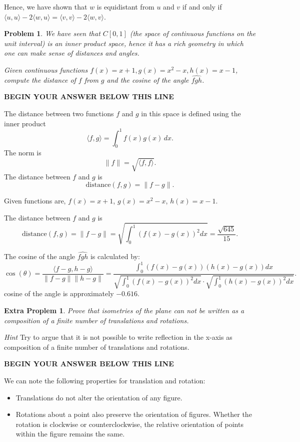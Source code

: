 \documentclass[letter,12pt]{article}
\newtheorem{problem}[main_theorem]{Problem}
\newtheorem{extraproblem}[main_theorem]{Extra Proplem}
\newcommand{\answerspacetop}{
	\begin{center}
		\textbf{BEGIN YOUR ANSWER BELOW THIS LINE} \\ \hrulefill
	\end{center}
}
\begin{document}
Hence, we have shown that $w$ is equidistant from $u$ and $v$ if and only if $\langle u,u \rangle - 2\langle w,u \rangle = \langle v,v \rangle - 2\langle w,v \rangle$.
\pagebreak

\begin{problem} We have seen that $C[0,1]$ (the space of continuous functions on the unit interval)  is an inner product space, hence it has a rich geometry in which one can make sense of distances and angles.

Given continuous functions $f(x)=x+1,g(x)=x^2-x,h(x)=x-1$, compute the distance of $f$ from $g$ and the cosine of the angle $\widehat{fgh}$.
\end{problem}

\answerspacetop
The distance between two functions $f$ and $g$ in this space is defined using the inner product
$$
\langle f, g \rangle = \int_0^1 f(x)g(x) \, dx.
$$
The norm is
$$
\|f\| = \sqrt{\langle f, f \rangle}.
$$
The distance between $f$ and $g$ is
$$
\text{distance}(f, g) = \|f - g\|.
$$

Given functions are, $f(x) = x + 1$, $g(x) = x^2 - x$, $h(x) = x - 1$.

The distance between $f$ and $g$ is 
$$
\text{distance}(f, g) = \|f - g\| = \sqrt{\int_0^1 (f(x) - g(x))^2 dx} = \frac{\sqrt{645}}{15}.
$$

The cosine of the angle $\widehat{fgh}$ is calculated by:
$$
\cos(\theta) = \frac{\langle f-g, h-g \rangle}{\|f-g\|\|h-g\|} = \frac{\int_0^1 (f(x) - g(x))(h(x) - g(x)) dx}{\sqrt{\int_0^1 (f(x) - g(x))^2 dx} \cdot \sqrt{\int_0^1 (h(x) - g(x))^2 dx}}.
$$
cosine of the angle is approximately $-0.616$.

\pagebreak

\begin{extraproblem} Prove that isometries of the plane can not be written as a composition of a finite number of translations and rotations.
\end{extraproblem}
\textit{Hint} Try to argue that it is not possible to write reflection in the x-axis as composition of a finite number of translations and rotations. 

\answerspacetop

We can note the following properties for translation and rotation:
\begin{itemize}
	\item Translations do not alter the orientation of any figure. 
	\item Rotations about a point also preserve the orientation of figures. Whether the rotation is clockwise or counterclockwise, the relative orientation of points within the figure remains the same.
\end{itemize}
\end{document}
